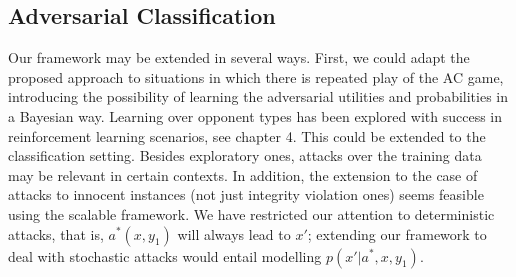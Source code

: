 \subsection{Adversarial Classification}
Our framework may be extended in several ways. First, we could adapt the proposed approach to situations in which there is repeated play of the AC game, introducing the possibility of learning the adversarial utilities and probabilities in a Bayesian way. Learning over opponent types has been explored with success in reinforcement learning scenarios, see chapter 4. This could be extended to the classification setting. Besides exploratory ones, attacks over the training data \parencite{biggio2012poisoning} may be relevant in certain contexts. 
In addition, the extension to the case of attacks to innocent instances (not just integrity violation ones) seems feasible using the scalable framework. %
We have restricted our attention to deterministic attacks, that is, $a^*(x,y_1)$ will always lead to $x'$; extending our framework to deal with stochastic attacks would entail modelling $p(x' \vert a^*, x, y_1)$. 




